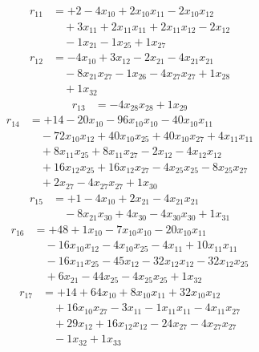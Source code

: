 \[\begin{aligned}
r_{11} &= + 2 - 4 x_{10} + 2 x_{10} x_{11} - 2 x_{10} x_{12} \\
 &\quad + 3 x_{11} + 2 x_{11} x_{11} + 2 x_{11} x_{12} - 2 x_{12} \\
 &\quad - 1 x_{21} - 1 x_{25} + 1 x_{27}
\end{aligned}\]
\[\begin{aligned}
r_{12} &= - 4 x_{10} + 3 x_{12} - 2 x_{21} - 4 x_{21} x_{21} \\
 &\quad - 8 x_{21} x_{27} - 1 x_{26} - 4 x_{27} x_{27} + 1 x_{28} \\
 &\quad + 1 x_{32}
\end{aligned}\]
\[\begin{aligned}
r_{13} &= - 4 x_{28} x_{28} + 1 x_{29}
\end{aligned}\]
\[\begin{aligned}
r_{14} &= + 14 - 20 x_{10} - 96 x_{10} x_{10} - 40 x_{10} x_{11} \\
 &\quad - 72 x_{10} x_{12} + 40 x_{10} x_{25} + 40 x_{10} x_{27} + 4 x_{11} x_{11} \\
 &\quad + 8 x_{11} x_{25} + 8 x_{11} x_{27} - 2 x_{12} - 4 x_{12} x_{12} \\
 &\quad + 16 x_{12} x_{25} + 16 x_{12} x_{27} - 4 x_{25} x_{25} - 8 x_{25} x_{27} \\
 &\quad + 2 x_{27} - 4 x_{27} x_{27} + 1 x_{30}
\end{aligned}\]
\[\begin{aligned}
r_{15} &= + 1 - 4 x_{10} + 2 x_{21} - 4 x_{21} x_{21} \\
 &\quad - 8 x_{21} x_{30} + 4 x_{30} - 4 x_{30} x_{30} + 1 x_{31}
\end{aligned}\]
\[\begin{aligned}
r_{16} &= + 48 + 1 x_{10} - 7 x_{10} x_{10} - 20 x_{10} x_{11} \\
 &\quad - 16 x_{10} x_{12} - 4 x_{10} x_{25} - 4 x_{11} + 10 x_{11} x_{11} \\
 &\quad - 16 x_{11} x_{25} - 45 x_{12} - 32 x_{12} x_{12} - 32 x_{12} x_{25} \\
 &\quad + 6 x_{21} - 44 x_{25} - 4 x_{25} x_{25} + 1 x_{32}
\end{aligned}\]
\[\begin{aligned}
r_{17} &= + 14 + 64 x_{10} + 8 x_{10} x_{11} + 32 x_{10} x_{12} \\
 &\quad + 16 x_{10} x_{27} - 3 x_{11} - 1 x_{11} x_{11} - 4 x_{11} x_{27} \\
 &\quad + 29 x_{12} + 16 x_{12} x_{12} - 24 x_{27} - 4 x_{27} x_{27} \\
 &\quad - 1 x_{32} + 1 x_{33}
\end{aligned}\]
